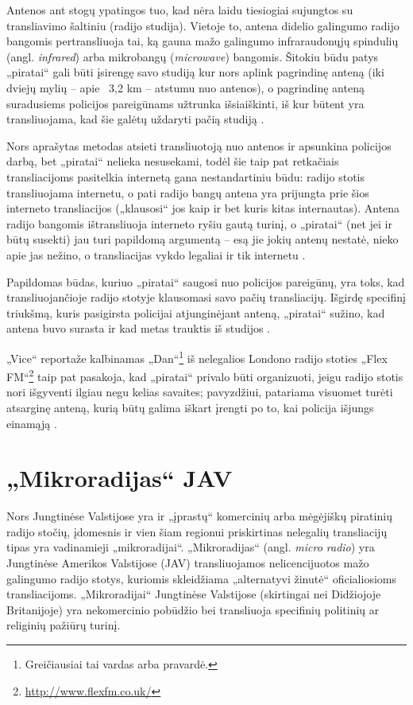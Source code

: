 \documentclass[kursinis-darbas]{vukf}
\begin{document}
Antenos ant stogų ypatingos tuo, kad nėra laidu tiesiogiai sujungtos su transliavimo šaltiniu (radijo studija). Vietoje to, antena didelio galingumo radijo bangomis pertransliuoja tai, ką gauna mažo galingumo infraraudonųjų spindulių (angl. \emph{infrared}) arba mikrobangų (\emph{microwave}) bangomis. Šitokiu būdu patys „piratai“ gali būti įsirengę savo studiją kur nors aplink pagrindinę anteną (iki dviejų mylių – apie ~3,2 km – atstumu nuo antenos), o pagrindinę anteną suradusiems policijos pareigūnams užtrunka išsiaiškinti, iš kur būtent yra transliuojama, kad šie galėtų uždaryti pačią studiją \cite{vice_london_pirate_sequences}.

Nors aprašytas metodas atsieti transliuotoją nuo antenos ir apsunkina policijos darbą, bet „piratai“ nelieka nesusekami, todėl šie taip pat retkačiais transliacijoms pasitelkia internetą gana nestandartiniu būdu: radijo stotis transliuojama internetu, o pati radijo bangų antena yra prijungta prie šios interneto transliacijos („klausosi“ jos kaip ir bet kuris kitas internautas). Antena radijo bangomis ištransliuoja interneto ryšiu gautą turinį, o „piratai“ (net jei ir būtų susekti) jau turi papildomą argumentą – esą jie jokių antenų nestatė, nieko apie jas nežino, o transliacijas vykdo legaliai ir tik internetu \cite{new_scientist_how_airwave_pirates_are_going_online}.

Papildomas būdas, kuriuo „piratai“ saugosi nuo policijos pareigūnų, yra toks, kad transliuojančioje radijo stotyje klausomasi savo pačių transliacijų. Išgirdę specifinį triukšmą, kuris pasigirsta policijai atjunginėjant anteną, „piratai“ sužino, kad antena buvo surasta ir kad metas trauktis iš studijos \cite{vice_london_pirate_sequences}.

„Vice“ reportaže kalbinamas „Dan“\footnote{Greičiausiai tai vardas arba pravardė.} iš nelegalios Londono radijo stoties „Flex FM“\footnote{\url{http://www.flexfm.co.uk/}} taip pat pasakoja, kad „piratai“ privalo būti organizuoti, jeigu radijo stotis nori išgyventi ilgiau negu kelias savaites; pavyzdžiui, patariama visuomet turėti atsarginę anteną, kurią būtų galima iškart įrengti po to, kai policija išjungs einamąją \cite{vice_london_pirate_sequences}.


\section{„Mikroradijas“ JAV}

Nors Jungtinėse Valstijose yra ir „įprastų“ komercinių arba mėgėjiškų piratinių radijo stočių, įdomesnis ir vien šiam regionui priskirtinas nelegalių transliacijų tipas yra vadinamieji „mikroradijai“. „Mikroradijas“ (angl. \emph{micro radio}) yra Jungtinėse Amerikos Valstijose (JAV) transliuojamos nelicencijuotos mažo galingumo radijo stotys, kuriomis skleidžiama „alternatyvi žinutė“ \cite[p.~134]{hc_key_concepts_in_radio_studies} oficialiosioms transliacijoms. „Mikroradijai“ Jungtinėse Valstijose (skirtingai nei Didžiojoje Britanijoje) yra nekomercinio pobūdžio bei transliuoja specifinių politinių ar religinių pažiūrų turinį.
\end{document}

